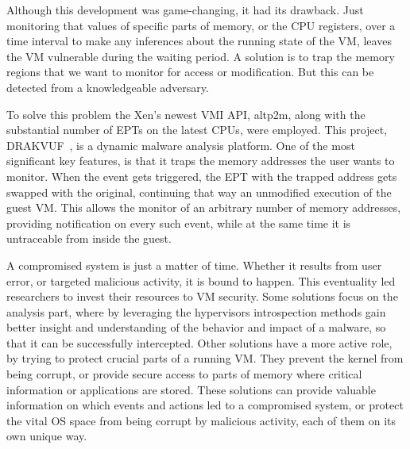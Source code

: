 \par Although this development was game-changing, it had its drawback. Just monitoring that values of specific parts of memory, or the \ac{CPU} registers, over a time interval to make any inferences about the running state of the \ac{VM}, leaves the \ac{VM} vulnerable during the waiting period. A solution is to trap the memory regions that we want to monitor for access or modification. But this can be detected from a knowledgeable adversary. 
\par To solve this problem the Xen’s newest \ac{VMI} \ac{API}, altp2m, along with the substantial number of \ac{EPT}s on the latest \ac{CPU}s, were employed. This project, DRAKVUF~\cite{lengyel2014drakvuf}, is a dynamic malware analysis platform. One of the most significant key features, is that it traps the memory addresses the user wants to monitor. When the event gets triggered, the \ac{EPT} with the trapped address gets swapped with the original, continuing that way an unmodified execution of the guest \ac{VM}. This allows the monitor of an arbitrary number of memory addresses, providing notification on every such event, while at the same time it is untraceable from inside the guest.

\par A compromised system is just a matter of time. Whether it results from user error, or targeted malicious activity, it is bound to happen. This eventuality led researchers to invest their resources to \ac{VM} security. Some solutions focus on the analysis part, where by leveraging the hypervisors introspection methods gain better insight and understanding of the behavior and impact of a malware, so that it can be successfully intercepted. Other solutions have a more active role, by trying to protect crucial parts of a running \ac{VM}. They prevent the kernel from being corrupt, or provide secure access to parts of memory where critical information or applications are stored. 
These solutions can provide valuable information on which events and actions led to a compromised system, or protect the vital \ac{OS} space from being corrupt by malicious activity, each of them on its own unique way. 


